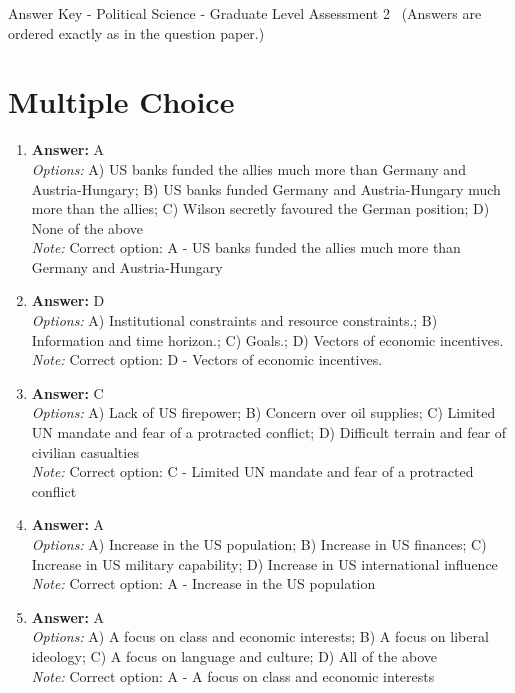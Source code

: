 \documentclass[12pt]{article}
\begin{document}
\begin{center}
Answer Key - Political Science - Graduate Level Assessment 2 \
\small (Answers are ordered exactly as in the question paper.)
\end{center}

\section*{Multiple Choice}
\begin{enumerate}[label=\arabic*.]
\item \textbf{Answer:} A
\\ \textit{Options:} A) US banks funded the allies much more than Germany and Austria-Hungary; B) US banks funded Germany and Austria-Hungary much more than the allies; C) Wilson secretly favoured the German position; D) None of the above
\\ \textit{Note:} Correct option: A - US banks funded the allies much more than Germany and Austria-Hungary
\item \textbf{Answer:} D
\\ \textit{Options:} A) Institutional constraints and resource constraints.; B) Information and time horizon.; C) Goals.; D) Vectors of economic incentives.
\\ \textit{Note:} Correct option: D - Vectors of economic incentives.
\item \textbf{Answer:} C
\\ \textit{Options:} A) Lack of US firepower; B) Concern over oil supplies; C) Limited UN mandate and fear of a protracted conflict; D) Difficult terrain and fear of civilian casualties
\\ \textit{Note:} Correct option: C - Limited UN mandate and fear of a protracted conflict
\item \textbf{Answer:} A
\\ \textit{Options:} A) Increase in the US population; B) Increase in US finances; C) Increase in US military capability; D) Increase in US international influence
\\ \textit{Note:} Correct option: A - Increase in the US population
\item \textbf{Answer:} A
\\ \textit{Options:} A) A focus on class and economic interests; B) A focus on liberal ideology; C) A focus on language and culture; D) All of the above
\\ \textit{Note:} Correct option: A - A focus on class and economic interests
\end{enumerate}
\end{document}
